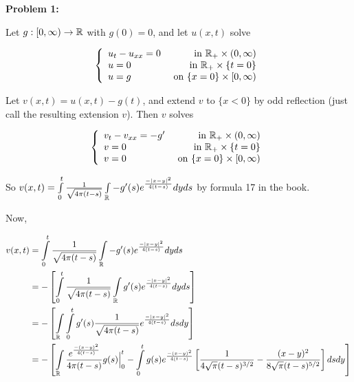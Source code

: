 \documentclass[a4paper,12pt]{article}
\begin{document}
{\bf Problem 1:} %

Let $g: [0,\infty) \to \mathbb{R}$ with $g(0) = 0$, and let $u(x,t)$ solve

\begin{displaymath}
   \left\{
     \begin{array}{lr}
       u_t - u_{xx} = 0 & \text{ in } \mathbb{R}_+ \times (0,\infty) \\
       u=0 & \text{ in } \mathbb{R}_+ \times \{t=0\}\\
       u=g & \text{ on } \{x=0\} \times [0,\infty)
     \end{array}
   \right.
\end{displaymath}

Let $v(x,t) = u(x,t) - g(t)$, and extend $v$ to $\{x<0\}$ by odd reflection (just call the resulting extension $v$). Then $v$ solves

\begin{displaymath}
   \left\{
     \begin{array}{lr}
       v_t - v_{xx} = -g' & \text{ in } \mathbb{R}_+ \times (0,\infty) \\
       v=0 & \text{ in } \mathbb{R}_+ \times \{t=0\}\\
       v=0 & \text{ on } \{x=0\} \times [0,\infty)
     \end{array}
   \right.
\end{displaymath}

So $v(x,t) = \int\limits_0^t \frac{1}{\sqrt{4 \pi (t-s)}} \int\limits_{\mathbb{R}} -g'(s) e^{\frac{-\left\lvert x-y \right\rvert^2}{4(t-s)}} dy ds$ by formula 17 in the book.

Now,

\begin{align*}
v(x,t) &= \int\limits_0^t \frac{1}{\sqrt{4 \pi (t-s)}} \int\limits_{\mathbb{R}} -g'(s) e^{\frac{-\left\lvert x-y \right\rvert^2}{4(t-s)}} dy ds\\
&= -\left[\int\limits_0^t \frac{1}{\sqrt{4 \pi (t-s)}} \int\limits_{\mathbb{R}} g'(s) e^{\frac{-\left\lvert x-y \right\rvert^2}{4(t-s)}} dy ds \right]\\
&= -\left[ \int\limits_{\mathbb{R}} \int\limits_0^tg'(s) \frac{1}{\sqrt{4 \pi (t-s)}} e^{\frac{-\left\lvert x-y \right\rvert^2}{4(t-s)}} ds dy \right]\\
&= -\left[ \int\limits_{\mathbb{R}} \frac{e^{\frac{-(x-y)^2}{4(t-s)}}}{4\pi(t-s)} g(s) \Big|_0^t - \int\limits_0^t g(s) e^{\frac{-(x-y)^2}{4(t-s)}} \left[ \frac{1}{4 \sqrt{\pi} (t-s)^{3/2}} -  \frac{(x-y)^2}{8 \sqrt{\pi} (t-s)^{5/2}}\right]  dsdy \right]\\
\end{align*}
\end{document}
